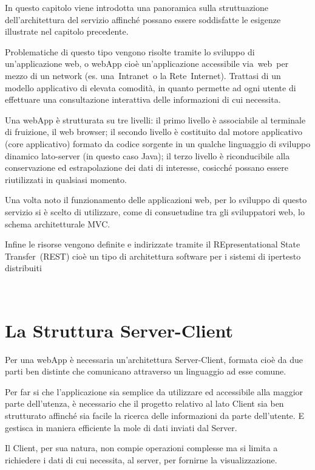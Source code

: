 In questo capitolo viene introdotta una panoramica sulla struttuazione dell’architettura del servizio affinché possano essere soddisfatte le esigenze illustrate nel capitolo precedente.

Problematiche di questo tipo vengono risolte tramite lo sviluppo di un’applicazione web, o webApp cioè un'applicazione accessibile via web per mezzo di un network (es. una Intranet o la Rete Internet). Trattasi di un modello applicativo di elevata comodità, in quanto permette ad ogni utente di effettuare una consultazione interattiva delle informazioni di cui necessita.

Una webApp è strutturata su tre livelli: il primo livello è associabile al terminale di fruizione, il web browser; il secondo livello è costituito dal motore applicativo (core applicativo)  formato da codice sorgente in un qualche linguaggio di sviluppo dinamico lato-server (in questo caso Java); il terzo livello è riconducibile alla conservazione ed estrapolazione dei dati di interesse, cosicché possano essere riutilizzati in qualsiasi momento.

Una volta noto il funzionamento delle applicazioni web, per lo sviluppo di questo servizio si è scelto di utilizzare, come di consuetudine tra gli sviluppatori web, lo schema architetturale MVC.

Infine le risorse vengono definite e indirizzate tramite il REpresentational State Transfer (REST) cioè un tipo di architettura software per i sistemi di ipertesto distribuiti

 \section{La Struttura Server-Client} %
\label{sec:la_struttura_server_client}



Per una webApp è necessaria un’architettura Server-Client, formata cioè da due parti ben distinte che comunicano attraverso un linguaggio ad esse comune.

Per far si che l’applicazione sia semplice da utilizzare ed accessibile alla maggior parte dell’utenza, è necessario che il progetto relativo al lato Client sia ben strutturato affinché sia facile la ricerca delle informazioni da parte dell’utente. E gestisca in maniera efficiente la mole di dati inviati dal Server.

Il Client, per sua natura, non compie operazioni complesse ma si limita a richiedere i dati di cui necessita, al server, per fornirne la visualizzazione. 

